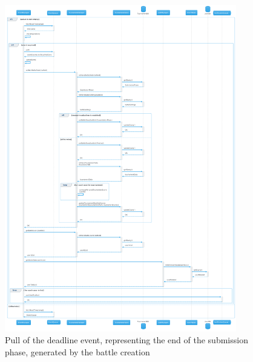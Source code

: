 \begin{figure}[H]
    \hspace{0.6cm}
    \includegraphics[width=0.9\textwidth]{Diagrams/sequence/create_battle_pull_deadline_submission.png}
    \caption{Pull of the deadline event, representing the end of the submission phase, generated by the battle creation}
\end{figure}

